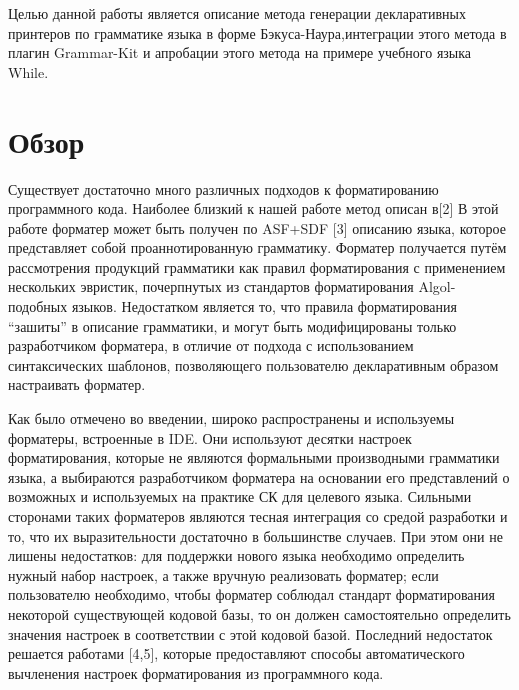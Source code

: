 \documentclass[conference]{IEEEtran}
\begin{document}
Целью данной работы является описание метода генерации декларативных
принтеров по грамматике языка в форме Бэкуса-Наура,интеграции этого метода
в плагин Grammar-Kit и апробации этого метода на примере учебного языка
While.

\section{Обзор}
Существует достаточно много различных подходов к форматированию
программного кода.
Наиболее близкий к нашей работе метод описан в[2]
В этой работе форматер может быть получен по ASF+SDF [3]
описанию языка, которое представляет собой проаннотированную грамматику.
Форматер получается путём 
рассмотрения продукций грамматики как правил форматирования
с применением нескольких эвристик,
почерпнутых из стандартов форматирования Algol-подобных языков.
Недостатком является то, что правила форматирования ``зашиты'' в
описание грамматики, и могут быть модифицированы только разработчиком
форматера,
в отличие от подхода с использованием синтаксических шаблонов,
позволяющего пользователю декларативным образом настраивать форматер.

Как было отмечено во введении, широко распространены и используемы
форматеры, встроенные в IDE.
Они используют десятки настроек форматирования,
которые не являются формальными производными грамматики языка,
а выбираются разработчиком форматера на основании его представлений
о возможных и используемых на практике СК для целевого языка.
Сильными сторонами таких форматеров являются тесная интеграция
со средой разработки и то, что их выразительности достаточно в
большинстве случаев.
При этом они не лишены недостатков:
для поддержки нового языка
необходимо определить нужный набор настроек, а также вручную реализовать
форматер;
если пользователю необходимо, чтобы форматер соблюдал стандарт
форматирования некоторой существующей кодовой базы, то он должен
самостоятельно определить значения настроек
в соответствии с этой кодовой базой.
Последний недостаток решается
работами [4,5], %
которые предоставляют
способы автоматического вычленения настроек форматирования из программного
кода.
\end{document}
